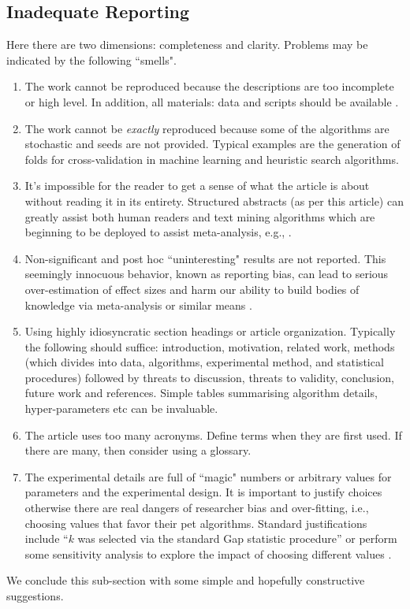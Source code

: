\documentclass[preprint,10pt]{elsarticle}
\begin{document}
\subsection{Inadequate Reporting}\label{sect:report}

Here there are two dimensions: completeness and clarity. Problems may be indicated by the following ``smells".

\begin{enumerate}
\item The work cannot be reproduced because the descriptions are too incomplete or high level.  In addition, all materials: data and scripts should be available \cite{Good16,Muna17}.
\item The work cannot be \textit{exactly} reproduced because some of the algorithms are stochastic and seeds are not provided.  Typical examples are the generation of folds for cross-validation in machine learning and heuristic search algorithms.
\item It's impossible for the reader to get a sense of what the article is about without reading it in its entirety. Structured abstracts (as per this article) can greatly assist both human readers \cite{Budg11,4460893,booth1997value} and text mining algorithms which are beginning to be deployed to assist meta-analysis, e.g., \cite{Szuc17}.
\item Non-significant and post hoc ``uninteresting" results are not reported. This seemingly innocuous behavior, known as reporting bias, can lead to serious over-estimation of effect sizes and harm our ability to build bodies of knowledge via meta-analysis or similar means \cite{Good16,Szuc17}.
\item Using highly idiosyncratic section headings or article organization.  Typically the following should suffice: introduction, motivation, related work, methods (which divides into data, algorithms, experimental method, and statistical procedures) followed by threats to discussion, threats to validity, conclusion, future work and references.  Simple tables summarising algorithm details, hyper-parameters etc can be invaluable. %
\item The article uses too many acronyms.  Define terms when they are first used.  If there are many, then consider using a glossary.  %
\item The experimental details are full of ``magic" numbers or arbitrary values for parameters and the experimental design. It is important to justify choices otherwise there are real dangers of researcher bias and over-fitting, i.e., choosing values that favor their pet algorithms.  Standard justifications include ``$k$ was selected via the standard Gap statistic procedure'' or perform some sensitivity analysis to explore the impact of choosing different values \cite{Salt00}.
\end{enumerate}
We conclude this sub-section with some simple and hopefully constructive suggestions.
\end{document}
